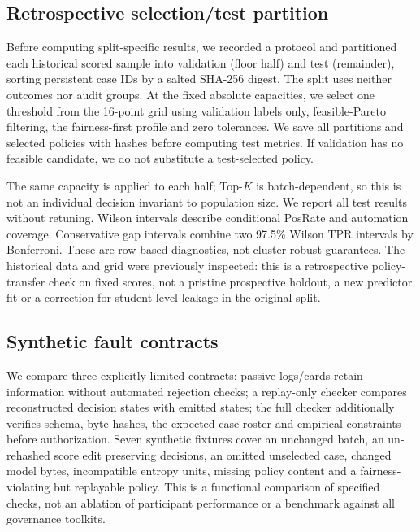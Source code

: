\subsection{Retrospective selection/test partition}
\label{sec:selection-test-design}
Before computing split-specific results, we recorded a protocol and partitioned each historical scored sample into validation (floor half) and test (remainder), sorting persistent case IDs by a salted SHA-256 digest. The split uses neither outcomes nor audit groups. At the fixed absolute capacities, we select one threshold from the 16-point grid using validation labels only, feasible-Pareto filtering, the fairness-first profile and zero tolerances. We save all partitions and selected policies with hashes before computing test metrics. If validation has no feasible candidate, we do not substitute a test-selected policy.

The same capacity is applied to each half; Top-$K$ is batch-dependent, so this is not an individual decision invariant to population size. We report all test results without retuning. Wilson intervals describe conditional PosRate and automation coverage. Conservative gap intervals combine two 97.5\% Wilson TPR intervals by Bonferroni. These are row-based diagnostics, not cluster-robust guarantees. The historical data and grid were previously inspected: this is a retrospective policy-transfer check on fixed scores, not a pristine prospective holdout, a new predictor fit or a correction for student-level leakage in the original split.

\subsection{Synthetic fault contracts}
\label{sec:fault-contract-design}
We compare three explicitly limited contracts: passive logs/cards retain information without automated rejection checks; a replay-only checker compares reconstructed decision states with emitted states; the full checker additionally verifies schema, byte hashes, the expected case roster and empirical constraints before authorization. Seven synthetic fixtures cover an unchanged batch, an un-rehashed score edit preserving decisions, an omitted unselected case, changed model bytes, incompatible entropy units, missing policy content and a fairness-violating but replayable policy. This is a functional comparison of specified checks, not an ablation of participant performance or a benchmark against all governance toolkits.
